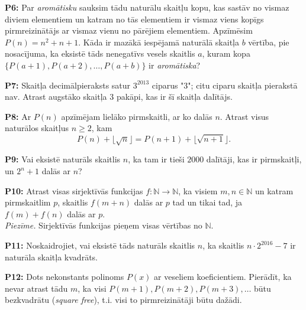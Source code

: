 \documentclass[11pt]{article}
\newenvironment{uzdevums}[1][\unskip]{%
\vspace{3mm}
\noindent
\textbf{#1:}
\noindent}
{}
\begin{document}
\begin{uzdevums}[P6]
Par {\em aromātisku} sauksim tādu naturālu skaitļu kopu, 
kas sastāv no vismaz diviem elementiem un katram no tās
elementiem ir vismaz viens kopīgs pirmreizinātājs ar 
vismaz vienu no pārējiem elementiem. Apzīmēsim 
$P(n)=n^2+n+1$. Kāda ir mazākā iespējamā naturālā skaitļa 
$b$ vērtība, pie nosacījuma, ka eksistē tāds nenegatīvs 
vesels skaitlis $a$, kuram kopa\\ 
$\{P(a+1),P(a+2),\ldots,P(a+b)\}$ ir {\em aromātiska}?
\end{uzdevums}

\begin{uzdevums}[P7]
Skaitļa decimālpieraksts satur $3^{2013}$ ciparus "3"; 
citu ciparu skaitļa pierakstā nav. Atrast augstāko skaitļa $3$ pakāpi, 
kas ir šī skaitļa dalītājs.
\end{uzdevums}

\begin{uzdevums}[P8]
Ar $P(n)$ apzīmējam lielāko pirmskaitli, ar ko dalās $n$. Atrast
visus naturālos skaitļus $n \geq 2$, kam
$$P(n) + \lfloor \sqrt{n} \rfloor = P(n+1) + \lfloor \sqrt{n+1} \rfloor.$$
\end{uzdevums}

\begin{uzdevums}[P9]
Vai eksistē naturāls skaitlis $n$, ka tam ir tieši $2000$ 
dalītāji, kas ir pirmskaitļi, un $2^n + 1$ dalās ar $n$?
\end{uzdevums}

\begin{uzdevums}[P10]
Atrast visas sirjektīvās funkcijas 
$f : \mathbb{N} \rightarrow \mathbb{N}$, ka
visiem $m, n \in \mathbb{N}$ un katram pirmskaitlim $p$, skaitlis
$f(m+n)$ dalās ar $p$ tad un tikai tad, ja 
$f(m)+f(n)$ dalās ar $p$.\\  
{\em Piezīme.} Sirjektīvās funkcijas pieņem visas vērtības no $\mathbb{N}$.
\end{uzdevums}

\begin{uzdevums}[P11]
Noskaidrojiet, vai eksistē tāds naturāls skaitlis $n$, ka 
skaitlis $n \cdot 2^{2016} - 7$ ir
naturāla skaitļa kvadrāts.
\end{uzdevums}

\begin{uzdevums}[P12]
Dots nekonstants polinoms $P(x)$ ar veseliem koeficientiem. 
Pierādīt, ka nevar atrast tādu $m$, ka visi $P(m+1),P(m+2),P(m+3),\ldots$ būtu bezkvadrātu ({\em square free}),  
t.i. visi to pirmreizinātāji būtu dažādi. 
\end{uzdevums}
\end{document}
